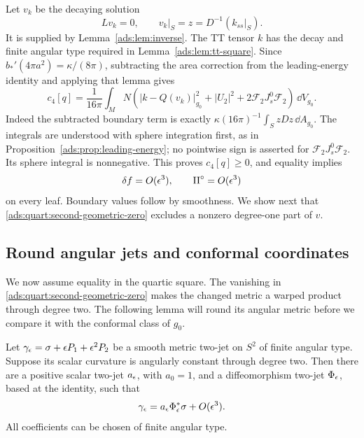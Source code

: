 Let \(v_k\) be the decaying solution
\begin{equation}
 Lv_k=0,\qquad v_k|_S=z=D^{-1}(k_{ss}|_S).
 \label{ads:quart:vk}
\end{equation}
It is supplied by Lemma~\ref{ads:lem:inverse}.  The TT tensor \(k\) has
the decay and finite angular type required in
Lemma~\ref{ads:lem:tt-square}.  Since
\(b_*'(4\pi a^2)=\kappa/(8\pi)\), subtracting the area correction
from the leading-energy identity and applying that lemma gives
\begin{equation}
 c_4[q]=\frac1{16\pi}\int_M N
   \left(
      |k-Q(v_k)|_{g_0}^2+|U_2|^2+2\mathcal F_2J_s^0\mathcal F_2
   \right)\,\dd V_{g_0}.
 \label{ads:quart:square}
\end{equation}
Indeed the subtracted boundary term is exactly
\(\kappa(16\pi)^{-1}\int_S zDz\,\dd A_{g_0}\).
The integrals are understood with sphere integration first, as in
Proposition~\ref{ads:prop:leading-energy}; no pointwise sign is asserted
for \(\mathcal F_2J_s^0\mathcal F_2\).  Its sphere integral is nonnegative.  This proves
\(c_4[q]\geq0\), and equality implies
\begin{equation}
 \delta f=O(\epsilon^3),\qquad
 \mathrm{II}^{\circ}=O(\epsilon^3)
 \label{ads:quart:second-geometric-zero}
\end{equation}
on every leaf.  Boundary values follow by smoothness.  We show next
that \eqref{ads:quart:second-geometric-zero} excludes a nonzero degree-one
part of \(v\).

\subsection{Round angular jets and conformal coordinates}
\label{ads:quart:round-section}

We now assume equality in the quartic square. The vanishing in
\eqref{ads:quart:second-geometric-zero} makes the changed metric a warped
product through degree two. The following lemma will round its angular
metric before we compare it with the conformal class of \(g_0\).

\begin{lemma}
\label{ads:lem:round-jet}
Let
\(\gamma_\epsilon=\sigma+\epsilon P_1+\epsilon^2P_2\) be a smooth metric
two-jet on \(S^2\) of finite angular type.  Suppose its scalar
curvature is angularly constant through degree two.  Then there are
a positive scalar two-jet \(a_\epsilon\), with \(a_0=1\), and a
diffeomorphism two-jet \(\Phi_\epsilon\), based at the identity, such that
\[
 \gamma_\epsilon=a_\epsilon\Phi_\epsilon^*\sigma+O(\epsilon^3).
\]
All coefficients can be chosen of finite angular type.
\end{lemma}

